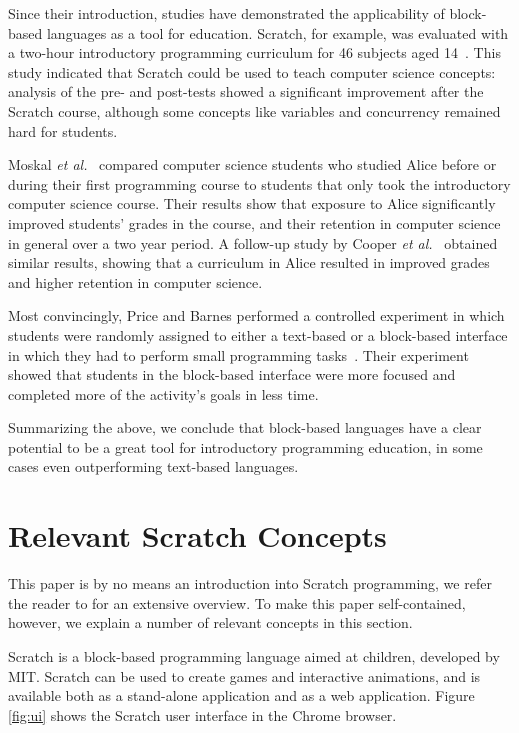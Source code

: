 \documentclass[times,10pt,twocolumn]{article}
\begin{document}
Since their introduction, studies have demonstrated the applicability of block-based languages as a tool for education. Scratch, for example, was evaluated with a two-hour introductory programming curriculum for 46 subjects aged 14~\cite{meerbaum-salant_learning_2010}. This study indicated that Scratch could be used to teach computer science concepts: analysis of the pre- and post-tests showed a significant improvement after the Scratch course, although some concepts like variables and concurrency remained hard for students.

Moskal \emph{et al.}~\cite{b._moskal_evaluating_2005} compared computer science students who studied Alice before or during their first programming course to students that only took the introductory computer science course. Their results show that exposure to Alice significantly improved students' grades in the course, and their retention in computer science in general over a two year period. A follow-up study by Cooper \emph{et al.}~\cite{cooper_teaching_2003} obtained similar results, showing that a curriculum in Alice resulted in improved grades and higher retention in computer science.

Most convincingly, Price and Barnes performed a controlled experiment in which students were randomly assigned to either a text-based or a block-based interface in  which they had to perform small programming tasks~\cite{price_comparing_2015}. Their experiment showed that students in the block-based interface were more focused and completed more of the activity's goals in less time.

Summarizing the above, we conclude that block-based languages have a clear potential to be a great tool for introductory programming education, in some cases even outperforming text-based languages.

\section{Relevant Scratch Concepts}
\label{sec:scratch}
This paper is by no means an introduction into Scratch programming, we refer the reader to \cite{brennan_creative_2014} for an extensive overview. To make this paper self-contained, however, we explain a number of relevant concepts in this section. 

Scratch is a block-based programming language aimed at children, developed by MIT. Scratch can be used to create games and interactive animations, and is available both as a stand-alone application and as a web application. Figure \ref{fig:ui} shows the Scratch user interface in the Chrome browser.
\end{document}
